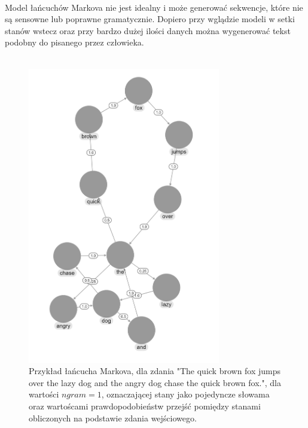 \documentclass{article}
\begin{document}
\\
Model łańcuchów Markova nie jest idealny i może generować sekwencje, które nie są sensowne lub poprawne gramatycznie. Dopiero przy wglądzie modeli w setki stanów wstecz oraz przy bardzo dużej ilości danych można wygenerować tekst podobny do pisanego przez człowieka. \\
\\
\begin{figure}[h]
    \centering
    \includegraphics[width=0.75\textwidth]{chain}
    \caption{Przykład łańcucha Markova, dla zdania "The quick brown fox jumps over the lazy dog and the angry dog chase the quick brown fox.", dla wartości $ngram = 1$, oznaczającej stany jako pojedyncze słowama oraz wartoścami prawdopodobieństw przejść pomiędzy stanami obliczonych na podstawie zdania wejściowego.}
    \label{fig:mesh1}
\end{figure}
\FloatBarrier
\end{document}
